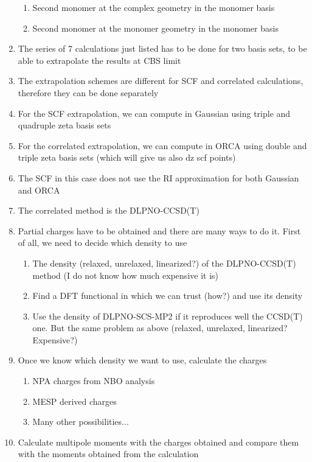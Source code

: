 \documentclass{article}
\begin{document}
\begin{enumerate}
\begin{enumerate}
        \item Second monomer at the complex geometry in the monomer basis
        \item Second monomer at the monomer geometry in the monomer basis
    \end{enumerate}
    \item The series of 7 calculations just listed has to be done for two basis sets, to be able to extrapolate the results at CBS limit
    \item The extrapolation schemes are different for SCF and correlated calculations, therefore they can be done separately
    \item For the SCF extrapolation, we can compute in Gaussian using triple and quadruple zeta basis sets
    \item For the correlated extrapolation, we can compute in ORCA using double and triple zeta basis sets (which will give us also dz scf points)
    \item The SCF in this case does not use the RI approximation for both Gaussian and ORCA
    \item The correlated method is the DLPNO-CCSD(T)
    \item Partial charges have to be obtained and there are many ways to do it. First of all, we need to decide which density to use
    \begin{enumerate}
        \item The density (relaxed, unrelaxed, linearized?) of the DLPNO-CCSD(T) method (I do not know how much expensive it is)
        \item Find a DFT functional in which we can trust (how?) and use its density
        \item Use the density of DLPNO-SCS-MP2 if it reproduces well the CCSD(T) one. But the same problem as above (relaxed, unrelaxed, linearized? Expensive?)
    \end{enumerate}
    \item Once we know which density we want to use, calculate the charges
    \begin{enumerate}
        \item NPA charges from NBO analysis
        \item MESP derived charges
        \item Many other possibilities...
    \end{enumerate}
    \item Calculate multipole moments with the charges obtained and compare them with the moments obtained from the calculation
\end{enumerate}
\end{document}
